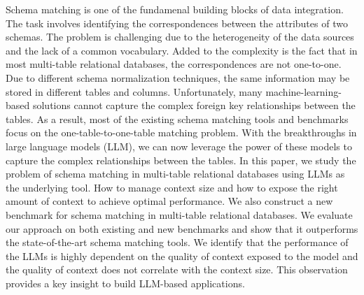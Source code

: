 Schema matching is one of the fundamenal building blocks of data integration.
The task involves identifying the correspondences between the attributes of two schemas.
The problem is challenging due to the heterogeneity of the data sources and the lack of a common vocabulary.
Added to the complexity is the fact that in most multi-table relational databases, the correspondences are not one-to-one.
Due to different schema normalization techniques, the same information may be stored in different tables and columns.
Unfortunately, many machine-learning-based solutions cannot capture the complex foreign key relationships between the tables.
As a result, most of the existing schema matching tools and benchmarks focus on the one-table-to-one-table matching problem.
With the breakthroughs in large language models (LLM), we can now leverage the power of these models to capture the complex relationships between the tables.
In this paper, we study the problem of schema matching in multi-table relational databases using LLMs as the underlying tool.
How to manage context size and how to expose the right amount of context to achieve optimal performance.
We also construct a new benchmark for schema matching in multi-table relational databases.
We evaluate our approach on both existing and new benchmarks and show that it outperforms the state-of-the-art schema matching tools.
We identify that the performance of the LLMs is highly dependent on the quality of context exposed to the model and the quality of context does not correlate with the context size.
This observation provides a key insight to build LLM-based applications.

